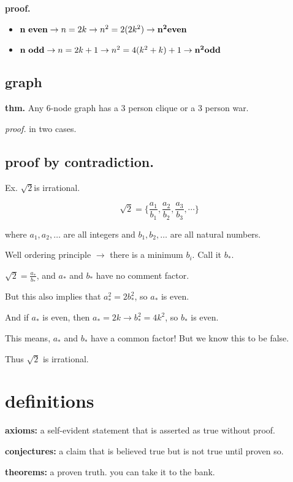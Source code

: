 \documentclass[11pt]{article}
\begin{document}
\smallskip

\textbf{proof.}

\begin{itemize}
\item $\bold{n\ even} \rightarrow n = 2k \rightarrow n^{2} = 2(2k^{2}) \rightarrow \bold{n^{2} even}$
\item $\bold{n\ odd} \rightarrow n = 2k + 1 \rightarrow n^{2} = 4(k^{2} + k) + 1 \rightarrow \bold{n^{2} odd}$ 
\end{itemize}

\subsection{graph}
\textbf{thm.} Any 6-node graph has a 3 person clique or a 3 person war.

\smallskip

\noindent \textit{proof.} in two cases.

\subsection{proof by contradiction.}
Ex. $\sqrt{2} $is irrational.

$$ \sqrt{2} = \Big\{ \frac{a_1}{b_1}, \frac{a_2}{b_2}, \frac{a_3}{b_3}, \cdots \Big\} $$

where $a_1, a_2, \dots$ are all integers and $b_1, b_2, \dots$ are all natural numbers.

Well ordering principle $\rightarrow$ there is a minimum $b_i$. Call it $b_*$.

$\sqrt{2} = \frac{a_*}{b_*}$, and $a_*$ and $b_*$ have no comment factor.

But this also implies that $a_*^{2} = 2b_*^{2}$, so $a_*$ is even.

And if $a_*$ is even, then $a_* = 2k \rightarrow b_*^{2} = 4k^{2}$, so $b_*$ is even.

This means, $a_*$ and $b_*$ have a common factor! But we know this to be false.

Thus $\sqrt{2}$ is irrational.



\section{definitions}

\textbf{axioms:} a self-evident statement that is asserted as true without proof.

\noindent \textbf{conjectures:} a claim that is believed true but is not true until proven so.

\noindent \textbf{theorems:} a proven truth. you can take it to the bank.
\end{document}
